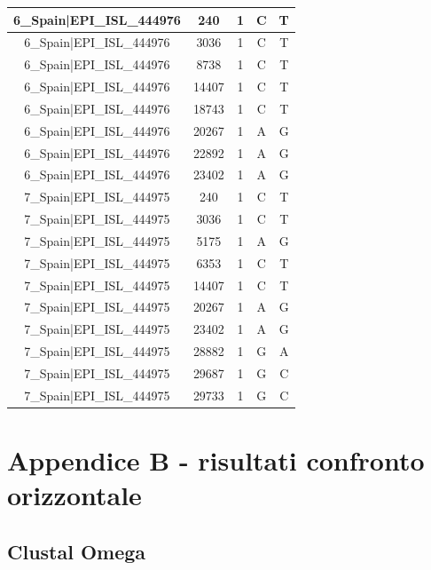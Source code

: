 \documentclass[a4paper,10pt]{article}
\begin{document}
\begin{longtable}{@{}ccccc@{}}
6\_Spain|EPI\_ISL\_444976 & 240 & 1 & C & T \\* \midrule
6\_Spain|EPI\_ISL\_444976 & 3036 & 1 & C & T \\* \midrule
6\_Spain|EPI\_ISL\_444976 & 8738 & 1 & C & T \\* \midrule
6\_Spain|EPI\_ISL\_444976 & 14407 & 1 & C & T \\* \midrule
6\_Spain|EPI\_ISL\_444976 & 18743 & 1 & C & T \\* \midrule
6\_Spain|EPI\_ISL\_444976 & 20267 & 1 & A & G \\* \midrule
6\_Spain|EPI\_ISL\_444976 & 22892 & 1 & A & G \\* \midrule
6\_Spain|EPI\_ISL\_444976 & 23402 & 1 & A & G \\* \midrule
7\_Spain|EPI\_ISL\_444975 & 240 & 1 & C & T \\* \midrule
7\_Spain|EPI\_ISL\_444975 & 3036 & 1 & C & T \\* \midrule
7\_Spain|EPI\_ISL\_444975 & 5175 & 1 & A & G \\* \midrule
7\_Spain|EPI\_ISL\_444975 & 6353 & 1 & C & T \\* \midrule
7\_Spain|EPI\_ISL\_444975 & 14407 & 1 & C & T \\* \midrule
7\_Spain|EPI\_ISL\_444975 & 20267 & 1 & A & G \\* \midrule
7\_Spain|EPI\_ISL\_444975 & 23402 & 1 & A & G \\* \midrule
7\_Spain|EPI\_ISL\_444975 & 28882 & 1 & G & A \\* \midrule
7\_Spain|EPI\_ISL\_444975 & 29687 & 1 & G & C \\* \midrule
7\_Spain|EPI\_ISL\_444975 & 29733 & 1 & G & C \\* \bottomrule
\end{longtable}

\newpage
\section{Appendice B - risultati confronto orizzontale}
\subsection{Clustal Omega}
\end{document}
